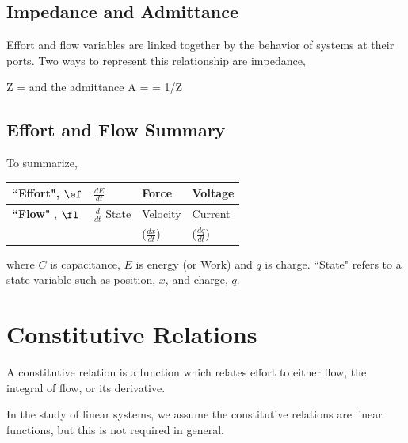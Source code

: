 \subsection{Impedance and Admittance}
Effort and flow variables are linked together by the behavior of systems at their ports.  Two ways to represent this relationship are impedance,

\bq
Z = 
\eq
and the admittance
\bq
A =  = 1/Z
\eq





\subsection{Effort and Flow Summary}
To summarize,	%

\begin{center}
\begin{tabular}{l|l|l|l}
\hline
{\bf ``Effort"}, $\ef$  &  $\frac{dE}{dt}$         & Force              & Voltage     \\
\hline
{\bf ``Flow" },  $\fl$  &  $\frac{d}{dt}$ State    & Velocity           & Current     \\
                     &                           & ($\frac{dx}{dt}$)    & ($\frac{dq}{dt}$) \\
\hline
\end{tabular}
\end{center}

where $C$ is capacitance, $E$ is energy (or Work) and $q$ is charge. ``State" refers to a state variable such as position, $x$, and charge, $q$.




\section{Constitutive Relations}
A constitutive relation is a function which relates effort to either flow, the integral of flow, or its derivative.

 In the study of linear systems, we assume the constitutive relations are linear functions, but this is not required in general.	%


